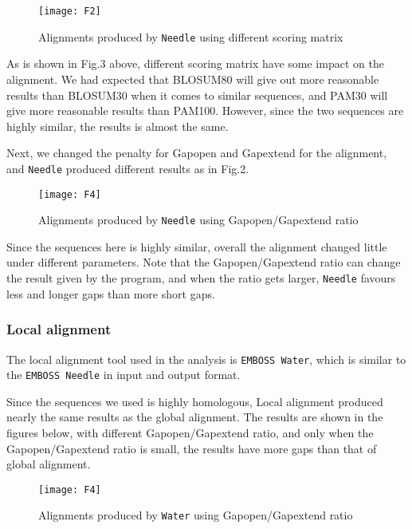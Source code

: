\documentclass[en,black,10pt,normal]{elegantnote}
\begin{document}
\begin{figure}[H]
    \centering
    \texttt{[image: F2]}
    \caption{Alignments produced by \texttt{Needle} using different scoring matrix}
    \label{F3}
\end{figure}

As is shown in Fig.3 above, different scoring matrix have some impact on the alignment.
We had expected that BLOSUM80 will give out more reasonable results than BLOSUM30
when it comes to similar sequences, and PAM30 will give more reasonable results than PAM100.
However, since the two sequences are highly similar, the results is almost the same.

Next, we changed the penalty for Gapopen and Gapextend for the alignment, 
and \texttt{Needle} produced different results as in Fig.2.

\begin{figure}[H]
    \centering
    \texttt{[image: F4]}
    \caption{Alignments produced by \texttt{Needle} using Gapopen/Gapextend ratio}
    \label{F4}
\end{figure}

Since the sequences here is highly similar, overall the alignment changed little
under different parameters. Note that the Gapopen/Gapextend ratio can change the result given by the program, 
and when the ratio gets larger, \texttt{Needle} favours less and longer gaps than
more short gaps.


\subsubsection{Local alignment}

The local alignment tool used in the analysis is \texttt{EMBOSS Water}, 
which is similar to the \texttt{EMBOSS Needle} in input and output format.

Since the sequences we used is highly homologous, Local alignment produced nearly the same results as the global alignment.
The results are shown in the figures below, with different Gapopen/Gapextend ratio, and only when the Gapopen/Gapextend ratio
is small, the results have more gaps than that of global alignment.

\begin{figure}[H]
    \centering
    \texttt{[image: F4]}
    \caption{Alignments produced by \texttt{Water} using Gapopen/Gapextend ratio}
    \label{Fig4}
\end{figure}
\end{document}
